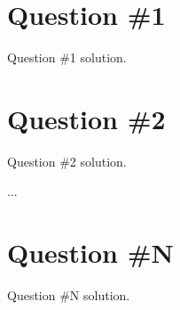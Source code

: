 \section*{Question \#1}
{
    Question \#1 solution.
}

\section*{Question \#2}
{
    Question \#2 solution.
}

...

\section*{Question \#N}
{
    Question \#N solution.
}
